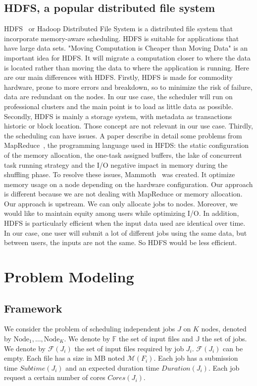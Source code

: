 \documentclass[a4paper]{article}
\newcommand{\Node}[1]{\ensuremath{\mathrm{Node}_{#1}}\xspace}
\newcommand{\inputs}{\ensuremath{\mathcal{F}}\xspace}
\newcommand{\memory}{\ensuremath{\mathcal{M}}\xspace}
\newcommand{\duration}{\mathit{Duration}\xspace}
\newcommand{\core}{\mathit{Cores}\xspace}
\newcommand{\submissiontime}{\mathit{Subtime}\xspace}
\newcommand{\fileset}{\ensuremath{\mathbb{F}}\xspace}
\newcommand{\jobset}{\ensuremath{\mathbb{J}}\xspace}
\begin{document}
\subsection{HDFS, a popular distributed file system}
HDFS~\cite{hdfs} or Hadoop Distributed File System is a distributed file system that incorporate memory-aware scheduling.
HDFS is suitable for applications that have large data sets. 
"Moving Computation is Cheaper than Moving Data" is an important idea for HDFS.
It will migrate a computation closer to where the data is located rather than moving the data to where
the application is running.
Here are our main differences with HDFS. Firstly, HDFS is made for commodity hardware, prone
to more errors and breakdown, so to minimize the risk of failure, data are redundant on the nodes.
In our use case, the scheduler will run on professional clusters and the main point is to load as 
little data as possible. Secondly, HDFS is mainly a storage system, with metadata as transactions historic or
block location. Those concept are not relevant in our use case. Thirdly, the scheduling 
can have issues. A paper describe in detail some problems from MapReduce~\cite{issue_with_hdfs}, the
programming language used in HFDS: the static configuration of the memory allocation, the one-task assigned buffers, the
lake of concurrent task running strategy and the I/O negative impact in memory during the shuffling phase.
To resolve these issues, Mammoth~\cite{Mammoth} was created. It optimize memory usage on a node depending on the hardware configuration.
Our approach is different because we are not dealing with MapReduce or memory allocation.
Our approach is upstream. We can only allocate jobs to nodes. Moreover, we would like to maintain
equity among users  while optimizing I/O.
In addition, HDFS is particularly efficient when the input data used are identical over time.
In our case, one user will submit a lot of different jobs using the same data, but between users,
the inputs are not the same. So HDFS would be less efficient.


\section{Problem Modeling}

\subsection{Framework}
We consider the problem of scheduling independent jobs $J$ on $K$ nodes,
denoted by $\Node{1},\ldots, \Node{K}$.
We denote by $\fileset$ the set of input files and $\jobset$ the set of jobs.
We denote by $\inputs(J_i)$ the set of input files required by job $J_i$. $\inputs(J_i)$ can be empty.
Each file has a size in MB noted $\memory(F_i)$.
Each job has a submission time $\submissiontime(J_i)$ and an 
expected duration time $\duration(J_i)$.
Each job request a certain number of cores $\core(J_i)$. 
\end{document}
